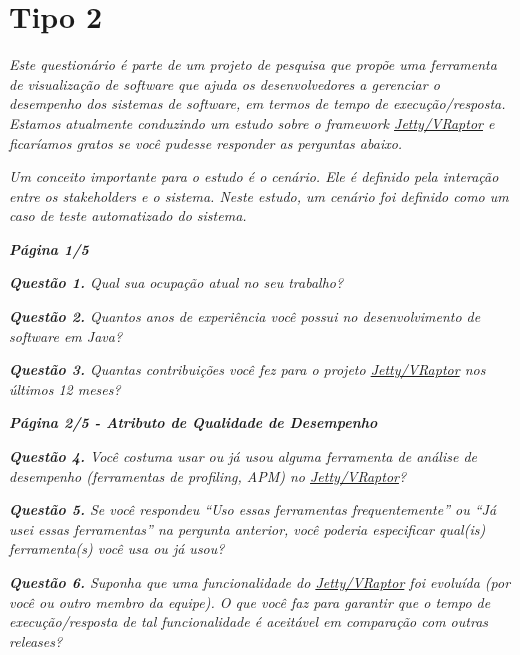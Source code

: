 \section{Tipo 2} \label{sec:apendice-a-tipo-2}

\begin{framed}
  \noindent \textit{\textbf{\toolName}}
  \par
  \par
  \noindent \textit{Este questionário é parte de um projeto de pesquisa que propõe uma ferramenta de visualização de software que ajuda os desenvolvedores a gerenciar o desempenho dos sistemas de software, em termos de tempo de execução/resposta. Estamos atualmente conduzindo um estudo sobre o framework \underline{Jetty/VRaptor} e ficaríamos gratos se você pudesse responder as perguntas abaixo.}
  \par
  \noindent \textit{Um conceito importante para o estudo é o cenário. Ele é definido pela interação entre os stakeholders e o sistema. Neste estudo, um cenário foi definido como um caso de teste automatizado do sistema.}
\end{framed}
	
\begin{framed}
	\noindent \textit{\textbf{Página 1/5}}
	\par
	\noindent \textit{\textbf{Questão 1.} Qual sua ocupação atual no seu trabalho?}
	\par
	\noindent \textit{\textbf{Questão 2.} Quantos anos de experiência você possui no desenvolvimento de software em Java?}
	\par
	\noindent \textit{\textbf{Questão 3.} Quantas contribuições você fez para o projeto \underline{Jetty/VRaptor} nos últimos 12 meses?}
\end{framed}

\begin{framed}
	\noindent \textit{\textbf{Página 2/5 - Atributo de Qualidade de Desempenho}}
	\par
	\noindent \textit{\textbf{Questão 4.} Você costuma usar ou já usou alguma ferramenta de análise de desempenho (ferramentas de profiling, APM) no \underline{Jetty/VRaptor}?}
	\par
	\noindent \textit{\textbf{Questão 5.} Se você respondeu ``Uso essas ferramentas frequentemente'' ou ``Já usei essas ferramentas'' na pergunta anterior, você poderia especificar qual(is) ferramenta(s) você usa ou já usou?}
	\par
	\noindent \textit{\textbf{Questão 6.} Suponha que uma funcionalidade do \underline{Jetty/VRaptor} foi evoluída (por você ou outro membro da equipe). O que você faz para garantir que o tempo de execução/resposta de tal funcionalidade é aceitável em comparação com outras releases?}
\end{framed}

